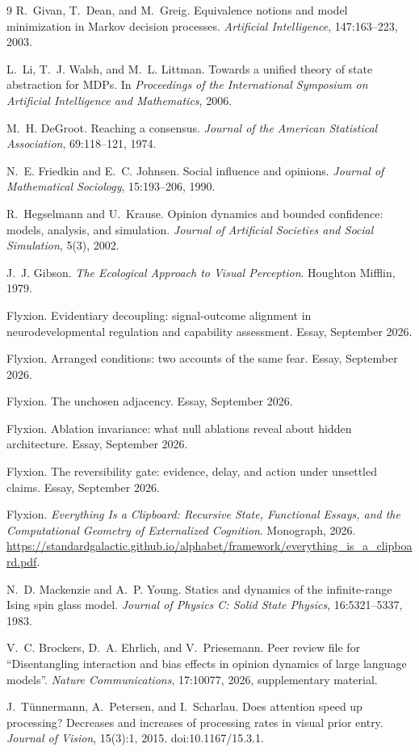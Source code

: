 \documentclass[11pt]{article}
\theoremstyle{definition}
\theoremstyle{remark}
\begin{document}
\begin{thebibliography}{9}
R.~Givan, T.~Dean, and M.~Greig.
Equivalence notions and model minimization in Markov decision processes.
\emph{Artificial Intelligence}, 147:163--223, 2003.

L.~Li, T.~J. Walsh, and M.~L. Littman.
Towards a unified theory of state abstraction for MDPs.
In \emph{Proceedings of the International Symposium on Artificial Intelligence and Mathematics}, 2006.

M.~H. DeGroot.
Reaching a consensus.
\emph{Journal of the American Statistical Association}, 69:118--121, 1974.

N.~E. Friedkin and E.~C. Johnsen.
Social influence and opinions.
\emph{Journal of Mathematical Sociology}, 15:193--206, 1990.

R.~Hegselmann and U.~Krause.
Opinion dynamics and bounded confidence: models, analysis, and simulation.
\emph{Journal of Artificial Societies and Social Simulation}, 5(3), 2002.

J.~J. Gibson.
\emph{The Ecological Approach to Visual Perception}.
Houghton Mifflin, 1979.

Flyxion.
Evidentiary decoupling: signal-outcome alignment in neurodevelopmental regulation and capability assessment.
Essay, September 2026.

Flyxion.
Arranged conditions: two accounts of the same fear.
Essay, September 2026.

Flyxion.
The unchosen adjacency.
Essay, September 2026.

Flyxion.
Ablation invariance: what null ablations reveal about hidden architecture.
Essay, September 2026.

Flyxion.
The reversibility gate: evidence, delay, and action under unsettled claims.
Essay, September 2026.

Flyxion.
\emph{Everything Is a Clipboard: Recursive State, Functional Essays, and the Computational Geometry of Externalized Cognition}.
Monograph, 2026.
\url{https://standardgalactic.github.io/alphabet/framework/everything_is_a_clipboard.pdf}.

N.~D. Mackenzie and A.~P. Young.
Statics and dynamics of the infinite-range Ising spin glass model.
\emph{Journal of Physics C: Solid State Physics}, 16:5321--5337, 1983.

V.~C. Brockers, D.~A. Ehrlich, and V.~Priesemann.
Peer review file for ``Disentangling interaction and bias effects in opinion dynamics of large language models''.
\emph{Nature Communications}, 17:10077, 2026, supplementary material.

J.~Tünnermann, A.~Petersen, and I.~Scharlau.
Does attention speed up processing? Decreases and increases of processing rates in visual prior entry.
\emph{Journal of Vision}, 15(3):1, 2015.
doi:10.1167/15.3.1.

\end{thebibliography}
\end{document}
